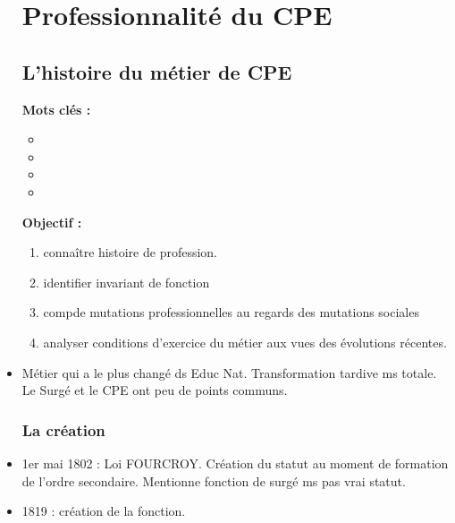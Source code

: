 \documentclass[12pt]{report}
\begin{document}
\begin{itemize}
\part{Professionnalité du CPE}

\chapter{L'histoire du métier de CPE}

\textbf{Mots clés : }
\begin{itemize}
\item 
\item 
\item 
\item 
\end{itemize}

\vspace{0.5cm}

\textbf{Objectif :}


\begin{enumerate}
\item connaître histoire de profession. \\
\item identifier invariant de fonction \\
\item compde mutations professionnelles au regards des mutations sociales \\
\item analyser conditions d'exercice du métier aux vues des évolutions récentes. \\
\end{enumerate}


\item Métier qui a le plus changé ds Educ Nat. Transformation tardive ms totale. Le Surgé et le CPE ont peu de points communs. \\

\section{La création}

\item 1er mai 1802 : Loi FOURCROY. Création du statut au moment de formation de l'ordre secondaire. Mentionne fonction de surgé ms pas vrai statut. \\

\item 1819 : création de la fonction. \\


\end{itemize}
\end{document}

